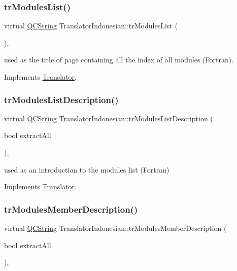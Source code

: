 \subsubsection{\texorpdfstring{trModulesList()}{trModulesList()}}
{\footnotesize\ttfamily virtual \mbox{\hyperlink{class_q_c_string}{Q\+C\+String}} Translator\+Indonesian\+::tr\+Modules\+List (\begin{DoxyParamCaption}{ }\end{DoxyParamCaption})\hspace{0.3cm}{\ttfamily [inline]}, {\ttfamily [virtual]}}

used as the title of page containing all the index of all modules (Fortran). 

Implements \mbox{\hyperlink{class_translator}{Translator}}.

\mbox{\label{class_translator_indonesian_affb17191ec25fd276cd2c49e1a2f92a6}} 
\subsubsection{\texorpdfstring{trModulesListDescription()}{trModulesListDescription()}}
{\footnotesize\ttfamily virtual \mbox{\hyperlink{class_q_c_string}{Q\+C\+String}} Translator\+Indonesian\+::tr\+Modules\+List\+Description (\begin{DoxyParamCaption}\item[{bool}]{extract\+All }\end{DoxyParamCaption})\hspace{0.3cm}{\ttfamily [inline]}, {\ttfamily [virtual]}}

used as an introduction to the modules list (Fortran) 

Implements \mbox{\hyperlink{class_translator}{Translator}}.

\mbox{\label{class_translator_indonesian_a84d2cb4ee8aab420684aec7dabdf76bb}} 
\subsubsection{\texorpdfstring{trModulesMemberDescription()}{trModulesMemberDescription()}}
{\footnotesize\ttfamily virtual \mbox{\hyperlink{class_q_c_string}{Q\+C\+String}} Translator\+Indonesian\+::tr\+Modules\+Member\+Description (\begin{DoxyParamCaption}\item[{bool}]{extract\+All }\end{DoxyParamCaption})\hspace{0.3cm}{\ttfamily [inline]}, {\ttfamily [virtual]}}

